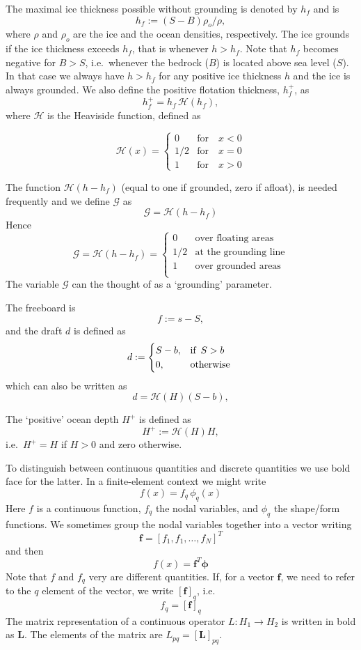 \documentclass[10pt,a4paper]{book}
\newcommand{\He}{\mathcal{H}}
\newcommand{\G}{\mathcal{G}}
\begin{document}
The maximal ice thickness possible without grounding is denoted by $h_f$ and is
\[
h_f :=(S-B) \rho_o/\rho ,
\]
where $\rho$ and $\rho_o$ are the ice and the ocean densities,
respectively. The ice grounds if the ice thickness exceeds $h_f$, that
is whenever $h>h_f$.  Note that $h_f$ becomes negative for $B>S$,
i.e.\ whenever the bedrock ($B$) is located above sea level ($S$). In
that case we always have $h>h_f$ for any positive ice thickness $h$
and the ice is always grounded. We also define the positive flotation
thickness, $h_f^+$, as
\[
h_f^+ = h_f \, \He(h_f) ,
\]
where $\He$ is the Heaviside function, defined as

\[ \He(x)=  \begin{cases} 
              0 & \text{for}   \quad x < 0 \\          
             1/2 & \text{for}  \quad x=0 \\
             1 & \text{for}    \quad x>0
   \end{cases}
\]


The function $\He(h-h_f)$ (equal to one if grounded, zero if afloat), is needed frequently and we define $\G$ as
\[
\G=\He(h-h_f)
\]
Hence
\begin{equation} \G =  \He(h-h_f) = \begin{cases} 
              0 & \text{over floating areas}    \\          
             1/2 & \text{at the grounding line}\\
             1 & \text{over grounded areas}   \\
   \end{cases}
\label{eq:Gdef}
\end{equation}
The variable $\G$ can the thought of as a `grounding' parameter.



The freeboard is
\[
f:=s-S,
\]
and the draft $d$ is defined as
\[
d:=\begin{cases} S-b , & \mbox{if } \, S>b \\  0 , & \hbox{otherwise }  \end{cases}
\]
which can also be written as
\[
d=\He(H) (S-b) ,
\]

The `positive' ocean depth $H^{+}$ is defined as
\begin{equation}
H^{+} := \He(H) H ,
\label{eq:Hplus}
\end{equation}
i.e.\ $H^{+}=H$ if $H>0$ and zero otherwise.




To distinguish between continuous quantities and discrete quantities we
use bold face for the latter.  In a finite-element context we might
write
\[ 
f(x) = f_q \, \phi_q(x) 
\]
Here $f$ is a continuous function, $f_q$ the nodal variables, and
$\phi_q$ the shape/form functions. We sometimes group the nodal
variables together into a vector writing
\[
\bm{f}=[f_1, f_1, \dots , f_N]^T
\]
and then
\[
f(x) = \bm{f}^T \bm{\phi}
\]
Note that $f$ and $f_q$ very are different quantities. If, for a vector
$\bm{f}$, we need to refer to the $q$ element of the vector, we write
$[\bm{f}]_q$, i.e.
\[
f_q=[\bm{f}]_q
\] 
The matrix representation of a continuous operator $L: H_1 \to H_2$ is
written in bold as $\bm{L}$. The elements of the matrix are
$L_{pq}=[\bm{L}]_{pq}$.
\end{document}
